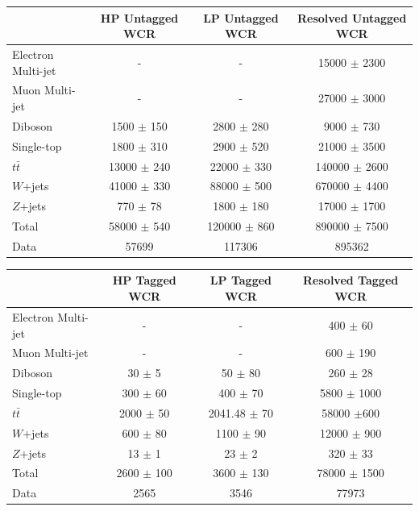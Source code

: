 \begin{table}
\begin{tabular}{|l|c|c|c|}
\hline
	  &	 HP  Untagged WCR &	 LP Untagged WCR &	Resolved Untagged WCR \\\hline 
	Electron Multi-jet &	- &	- &	15000 $\pm$ 2300 \\\hline 
	Muon Multi-jet &	- &	- &	27000 $\pm$ 3000 \\\hline 
	Diboson &	1500 $\pm$ 150 &	2800 $\pm$ 280 &	9000 $\pm$ 730 \\\hline 
	Single-top &	1800 $\pm$ 310 &	2900 $\pm$ 520 &	21000 $\pm$ 3500 \\\hline 
	$t\bar{t}$ &	13000 $\pm$ 240 &	22000 $\pm$ 330 &	140000 $\pm$ 2600 \\\hline 
	$W$+jets &	41000 $\pm$ 330 &	88000 $\pm$ 500 &	670000 $\pm$ 4400 \\\hline 
	$Z$+jets &	770 $\pm$ 78 &	1800 $\pm$ 180 &	17000 $\pm$ 1700 \\\hline 
	Total &	58000 $\pm$ 540 &	120000 $\pm$ 860 &	890000 $\pm$ 7500 \\\hline 
	Data &	57699 &	117306 &	895362 \\\hline 
\end{tabular}


\begin{tabular}{|l|c|c|c|}
\hline
	  &	 HP Tagged WCR &	 LP Tagged WCR &	Resolved Tagged WCR \\\hline 
	Electron Multi-jet &	- &	- &	400 $\pm$ 60 \\\hline 
	Muon Multi-jet &	- &	- &	600 $\pm$ 190 \\\hline 
	Diboson &	30 $\pm$ 5 &	50 $\pm$ 80&	260 $\pm$ 28 \\\hline 
	Single-top &	300 $\pm$ 60 &	400 $\pm$ 70 &	5800 $\pm$ 1000 \\\hline 
	$t\bar{t}$ &	2000 $\pm$ 50&	2041.48 $\pm$ 70 &	58000 $\pm$600 \\\hline 
	$W$+jets &	600 $\pm$ 80 &	1100 $\pm$ 90 &	12000 $\pm$ 900 \\\hline 
	$Z$+jets &	13 $\pm$ 1 &	23 $\pm$ 2 &	320 $\pm$ 33 \\\hline 
	Total &	2600 $\pm$ 100 &	3600 $\pm$ 130 &	78000 $\pm$ 1500 \\\hline 
	Data &	2565 &	3546 &	77973 \\\hline 
\end{tabular}


\end{table}
